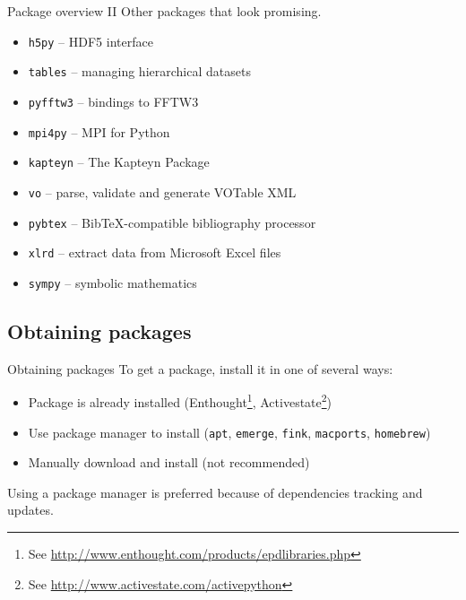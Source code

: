 \documentclass[xetex,10pt]{beamer}
\def\spacer{\vspace*{1em}}
\begin{document}
\begin{frame}[fragile]{Package overview II}
	Other packages that look promising.
	\spacer
	\begin{itemize}
		\item \texttt{h5py} -- HDF5 interface
		\item \texttt{tables} -- managing hierarchical datasets
		\pause
		\item \texttt{pyfftw3} -- bindings to FFTW3
		\item \texttt{mpi4py} -- MPI for Python
		\pause
		\item \texttt{kapteyn} -- The Kapteyn Package
		\item \texttt{vo} -- parse, validate and generate VOTable XML
		\pause
		\item \texttt{pybtex} -- BibTeX-compatible bibliography processor
		\item \texttt{xlrd} -- extract data from Microsoft Excel files
		\item \texttt{sympy} -- symbolic mathematics
	\end{itemize}
\end{frame}

\subsection{Obtaining packages}

\begin{frame}[fragile]{Obtaining packages}
	To get a package, install it in one of several ways:
	
	\spacer
	
	\begin{itemize}
		\item Package is already installed (Enthought\footnote[frame]{See \url{http://www.enthought.com/products/epdlibraries.php}}, Activestate\footnote[frame]{See \url{http://www.activestate.com/activepython}})
		\pause
		\item Use package manager to install (\texttt{apt}, \texttt{emerge}, \texttt{fink}, \texttt{macports}, \texttt{homebrew})
		\pause
		\item Manually download and install (not recommended)
	\end{itemize}
	
	\spacer
	\pause
	
	Using a package manager is preferred because of dependencies tracking and updates.
\end{frame}
\end{document}
